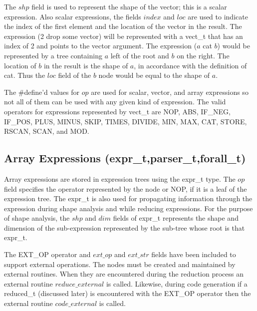  The $shp$ field is used to represent the shape of the vector; this is a
scalar expression.  Also scalar expressions, the fields $index$ and $loc$
are used to indicate the index of the first element and the location of
the vector in the result.  The expression (2 drop some vector)
will be represented with a vect\_t that has an index
of 2 and points to the vector argument.  The expression ($a$ cat $b$) would be
represented by a tree containing $a$ left of the root and $b$ on the right.
The location of $b$ in the result is the shape of $a$, in accordance with
the definition of cat.  Thus the $loc$ field of the $b$ node would be equal to
the shape of $a$.

The \#define'd values for $op$ are used for scalar, vector, and array 
expressions so not all of them can be used with any given kind of expression.
The valid operators for expressions represented by vect\_t are
NOP, ABS, IF\_NEG, IF\_POS, PLUS, MINUS, SKIP, TIMES, DIVIDE, MIN, MAX,
CAT, STORE, RSCAN, SCAN, and MOD.

\subsection{Array Expressions (expr\_t,parser\_t,forall\_t)}
Array expressions are stored in expression trees using the expr\_t type.
The $op$ field specifies the operator represented by the node or NOP, if
it is a leaf of the expression tree.
The expr\_t is also used for propagating information through the expression
during shape analysis and while reducing expressions.  For the purpose of
shape analysis, the $shp$ and $dim$ fields of expr\_t represents the shape and
dimension of the
sub-expression represented by the sub-tree whose root is that expr\_t.

The EXT\_OP operator and $ext\_op$ and $ext\_str$ fields
have been included to support external operations.
The nodes must be created and maintained by external routines.  When they
are encountered during the reduction process an external routine 
$reduce\_external$ is called.  Likewise, during code generation if 
a reduced\_t (discussed later) is encountered with the EXT\_OP operator then
the external routine $code\_external$ is called.

